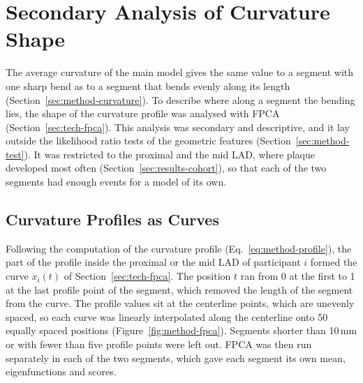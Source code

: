 \section{Secondary Analysis of Curvature Shape}
\label{sec:method-fpca}

The average curvature of the main model gives the same value to a segment with one sharp bend as to a segment that bends evenly along its length (Section~\ref{sec:method-curvature}).
To describe where along a segment the bending lies, the shape of the curvature profile was analysed with FPCA (Section~\ref{sec:tech-fpca}).
This analysis was secondary and descriptive, and it lay outside the likelihood ratio tests of the geometric features (Section~\ref{sec:method-test}).
It was restricted to the proximal and the mid LAD, where plaque developed most often (Section~\ref{sec:results-cohort}), so that each of the two segments had enough events for a model of its own.

\subsection{Curvature Profiles as Curves}

Following the computation of the curvature profile (Eq.~\eqref{eq:method-profile}), the part of the profile inside the proximal or the mid LAD of participant $i$ formed the curve $x_i(t)$ of Section~\ref{sec:tech-fpca}.
The position $t$ ran from 0 at the first to 1 at the last profile point of the segment, which removed the length of the segment from the curve.
The profile values sit at the centerline points, which are unevenly spaced, so each curve was linearly interpolated along the centerline onto 50 equally spaced positions (Figure~\ref{fig:method-fpca}).
Segments shorter than 10\,mm or with fewer than five profile points were left out.
FPCA was then run separately in each of the two segments, which gave each segment its own mean, eigenfunctions and scores.

